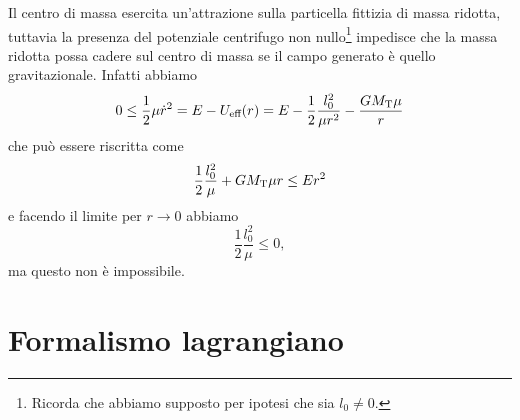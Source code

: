 Il centro di massa esercita un'attrazione sulla particella fittizia di massa
ridotta, tuttavia la presenza del potenziale centrifugo non
nullo\footnote{Ricorda che abbiamo supposto per ipotesi che sia $l_0\neq 0$.}
impedisce che la massa ridotta possa cadere sul centro di massa se il campo
generato è quello gravitazionale. Infatti abbiamo
\begin{equation}
  0\leq \frac{1}{2}\mu\dot{r}^2 = E - U_\textup{eff}(r) = E -
  \frac{1}{2}\frac{l_0^2}{\mu r^2} - \frac{GM_\textup{T}\mu}{r}
\end{equation}
che può essere riscritta come
\begin{equation}
  \frac{1}{2}\frac{l_0^2}{\mu} + GM_\textup{T}\mu r \leq Er^2
\end{equation}
e facendo il limite per $r \to 0$ abbiamo
\begin{equation}
  \frac{1}{2}\frac{l_0^2}{\mu} \leq 0,
\end{equation}
ma questo non è impossibile.

\section{Formalismo lagrangiano}
\label{sec:formalismo-lagrange}



